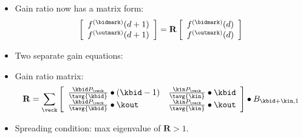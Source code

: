 \begin{frame}[plain]

  \begin{itemize}
  \item<1->
    Gain ratio now has a matrix form:
    $$
    \left[
      \begin{array}{c}
        f^{\textnormal{(\bidmark)}}(d+1) \\
        f^{\textnormal{(\outmark)}}(d+1)
      \end{array}
    \right]
    =
    \mathbf{R} 
    \left[
      \begin{array}{c}
        f^{\textnormal{(\bidmark)}}(d) \\
        f^{\textnormal{(\outmark)}}(d)
      \end{array}
    \right]
    $$
  \item<2->
    Two separate gain equations:
  \end{itemize}
    \begin{itemize}
  \item<4->
    Gain ratio matrix:
    $$
    \mathbf{R}
    =
    \sum_{\veck}
    \left[
      \begin{array}{ll}
        \frac{\kbid P_{\veck}}{\tavg{\kbid}}
        \bullet
        (\kbid-1)
        &
        \frac{\kin P_{\veck}}{\tavg{\kin}}
        \bullet
        \kbid
        \\
        \frac{\kbid P_{\veck}}{\tavg{\kbid}}
        \bullet
        \kout
        &
        \frac{\kin P_{\veck}}{\tavg{\kin}}
        \bullet
        \kout
      \end{array}
    \right]
    \bullet
    B_{\kbid+\kin,1}
    $$
  \item<5->
    Spreading condition:
    max eigenvalue of $\mathbf{R} > 1$.
  \end{itemize}

\end{frame}


